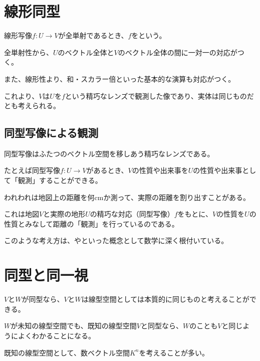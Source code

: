 \documentclass[../../../topic_linear-algebra]{subfiles}
\begin{document}
\sectionline
\section{線形同型}

線形写像$f\colon U \to V$が全単射であるとき、$f$をという。

\br

全単射性から、$U$のベクトル全体と$V$のベクトル全体の間に一対一の対応がつく。

また、線形性より、和・スカラー倍といった基本的な演算も対応がつく。

\br

これより、$V$は$U$を$f$という精巧なレンズで観測した像であり、実体は同じものだとも考えられる。

\subsection{同型写像による観測}

同型写像はふたつのベクトル空間を移しあう精巧なレンズである。

たとえば同型写像$f\colon U \to V$があるとき、$V$の性質や出来事を$U$の性質や出来事として「観測」することができる。

\br

われわれは地図上の距離を何cmか測って、実際の距離を割り出すことがある。

これは地図$V$と実際の地形$U$の精巧な対応（同型写像）$f$をもとに、$V$の性質を$U$の性質とみなして距離の「観測」を行っているのである。

\br

このような考え方は、やといった概念として数学に深く根付いている。

\sectionline
\section{同型と同一視}

$V$と$W$が同型なら、$V$と$W$は線型空間としては本質的に同じものと考えることができる。

$W$が未知の線型空間でも、既知の線型空間$V$と同型なら、$W$のことも$V$と同じようによくわかることになる。

\br

既知の線型空間として、数ベクトル空間$K^n$を考えることが多い。
\end{document}
